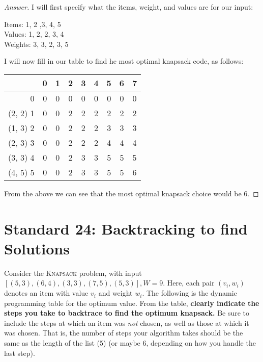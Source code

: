 \documentclass[11pt]{article}
\theoremstyle{definition}
\theoremstyle{definition}
\theoremstyle{definition}
\begin{document}
\begin{proof}[Answer]
I will first specify what the items, weight, and values are for our input: \\
\begin{center}
Items: 1, 2 ,3, 4, 5 \\
Values: 1, 2, 2, 3, 4 \\
Weights: 3, 3, 2, 3, 5 \\
\end{center}
I will now fill in our table to find he most optimal knapsack code, as follows: \\
\begin{tabular}{|r|c|c|c|c|c|c|c|c|}
\hline
& 0& 1& 2& 3& 4& 5& 6& 7 \\ 
 \hline
0 & 0 & 0 & 0 & 0 & 0 & 0 & 0 & 0  \\ 
\hline
(2, 2) 1 & 0 & 0 & 2 & 2 & 2 & 2 & 2 & 2  \\ 
\hline
(1, 3) 2 & 0 & 0 & 2 & 2 & 2 & 3 & 3 & 3  \\ 
\hline
(2, 3) 3 & 0 & 0 & 2 & 2 & 2 & 4 & 4 & 4  \\ 
\hline
(3, 3) 4 & 0 & 0 & 2 & 3 & 3 & 5 & 5 & 5  \\ 
\hline
(4, 5) 5 & 0 & 0 & 2 & 3 & 3 & 5 & 5 & 6  \\ 
\hline
\end{tabular}
From the above we can see that the most optimal knapsack choice would be 6.
\end{proof}

\newpage
\section{Standard 24: Backtracking to find Solutions}
Consider the \textsc{Knapsack} problem, with input $[ (5, 3), (6, 4), (3, 3), (7, 5),(5, 3)], W=9$. Here, each pair $(v_i, w_i)$ denotes an item with value $v_i$ and weight $w_i$. The following is the dynamic programming table for the optimum value. From the table, \textbf{clearly indicate the steps you take to backtrace to find the optimum knapsack.} Be sure to include the steps at which an item was \emph{not} chosen, as well as those at which it was chosen. That is, the number of steps your algorithm takes should be the same as the length of the list (5) (or maybe 6, depending on how you handle the last step). 
\end{document}
